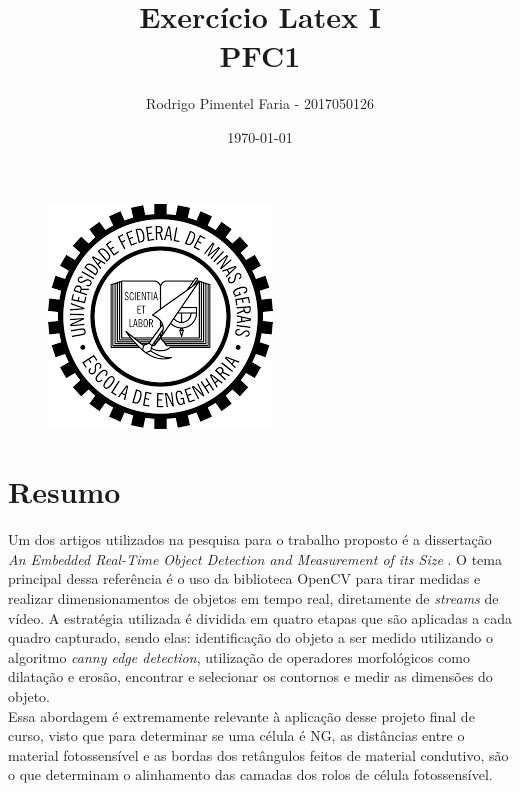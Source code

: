 \documentclass[10pt]{article}
\begin{document}
\title{
    Exercício Latex I \\
    \large PFC1}

\begin{figure}[t]
    \centering
    \includegraphics[scale=0.7]{images/brasao_ufmg.png}
\end{figure}

\author{Rodrigo Pimentel Faria - 2017050126}
\date{\today}
\maketitle

\section{Resumo}

Um dos artigos utilizados na pesquisa para o trabalho proposto é a dissertação \emph{An Embedded Real-Time Object Detection and Measurement of its Size} \cite{othman}. O tema principal dessa referência é o uso da biblioteca OpenCV para tirar medidas e realizar dimensionamentos de objetos em tempo real, diretamente de \emph{streams} de vídeo. A estratégia utilizada é dividida em quatro etapas que são aplicadas a cada quadro capturado, sendo elas: identificação do objeto a ser medido utilizando o algoritmo \emph{canny edge detection}, utilização de operadores morfológicos como dilatação e erosão, encontrar e selecionar os contornos e medir as dimensões do objeto.\\
Essa abordagem é extremamente relevante à aplicação desse projeto final de curso, visto que para determinar se uma célula é NG, as distâncias entre o material fotossensível e as bordas dos retângulos feitos de material condutivo, são o que determinam o alinhamento das camadas dos rolos de célula fotossensível.
\end{document}
